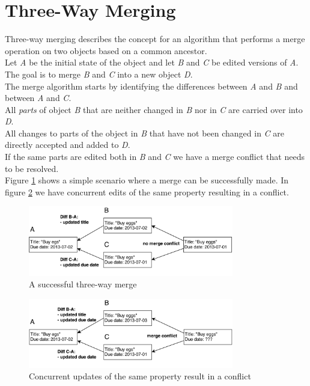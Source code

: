 \section{Three-Way Merging}
\label{sec:background.merging}
Three-way merging describes the concept for an algorithm that performs a merge operation on two objects based on a common ancestor.\\
Let \emph{A} be the initial state of the object and let \emph{B} and \emph{C} be edited versions of \emph{A}.
The goal is to merge \emph{B} and \emph{C} into a new object \emph{D}.\\
The merge algorithm starts by identifying the differences between \emph{A} and \emph{B} and between \emph{A} and \emph{C}.\\
All \emph{parts} of object \emph{B} that are neither changed in \emph{B} nor in \emph{C} are carried over into \emph{D}.\\
All changes to parts of the object in \emph{B} that have not been changed in \emph{C} are directly accepted and added to \emph{D}.\\
If the same parts are edited both in \emph{B} and \emph{C} we have a merge conflict that needs to be resolved.\\
Figure \ref{fig:background.merging.success} shows a simple scenario where a merge can be successfully made.
In figure \ref{fig:background.merging.conflict} we have concurrent edits of the same property resulting in a conflict.\\
\begin{figure}[merge-success]
  \centering
  \includegraphics[width=0.8\textwidth]{img/three-way-merging}
  \caption{A successful three-way merge}
  \label{fig:background.merging.success}
\end{figure}
\begin{figure}[merge-conflict]
  \centering
  \includegraphics[width=0.8\textwidth]{img/three-way-merging-conflict}
  \caption{Concurrent updates of the same property result in a conflict}
  \label{fig:background.merging.conflict}
\end{figure}
